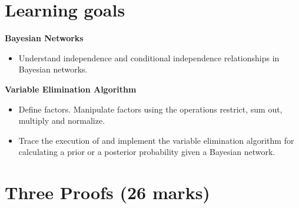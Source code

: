 \documentclass[12pt]{article}
\begin{document}
\section*{Learning goals}

{\bf Bayesian Networks}
\begin{itemize}
    \item Understand independence and conditional independence relationships in Bayesian networks.
\end{itemize}
{\bf Variable Elimination Algorithm}
\begin{itemize}
    \item Define factors. Manipulate factors using the operations restrict, sum out, multiply and normalize.
    \item Trace the execution of and implement the variable elimination algorithm for calculating a prior or a posterior probability given a Bayesian network.
\end{itemize}


\newpage

\section{Three Proofs (26 marks)}
\end{document}

